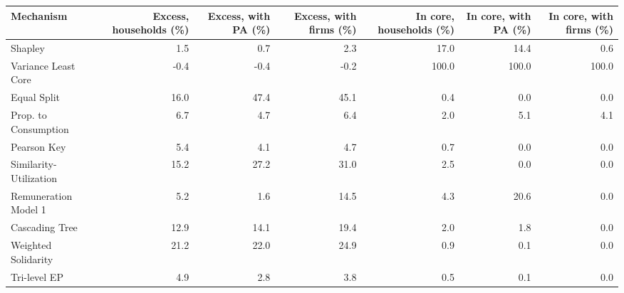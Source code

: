 \begin{tabular}{lrrrrrr}
\toprule
Mechanism & Excess, households (\%) & Excess, with PA (\%) & Excess, with firms (\%) & In core, households (\%) & In core, with PA (\%) & In core, with firms (\%) \\
\midrule
Shapley & 1.5 & 0.7 & 2.3 & 17.0 & 14.4 & 0.6 \\
Variance Least Core & -0.4 & -0.4 & -0.2 & 100.0 & 100.0 & 100.0 \\
Equal Split & 16.0 & 47.4 & 45.1 & 0.4 & 0.0 & 0.0 \\
Prop. to Consumption & 6.7 & 4.7 & 6.4 & 2.0 & 5.1 & 4.1 \\
Pearson Key & 5.4 & 4.1 & 4.7 & 0.7 & 0.0 & 0.0 \\
Similarity-Utilization & 15.2 & 27.2 & 31.0 & 2.5 & 0.0 & 0.0 \\
Remuneration Model 1 & 5.2 & 1.6 & 14.5 & 4.3 & 20.6 & 0.0 \\
Cascading Tree & 12.9 & 14.1 & 19.4 & 2.0 & 1.8 & 0.0 \\
Weighted Solidarity & 21.2 & 22.0 & 24.9 & 0.9 & 0.1 & 0.0 \\
Tri-level EP & 4.9 & 2.8 & 3.8 & 0.5 & 0.1 & 0.0 \\
\bottomrule
\end{tabular}
